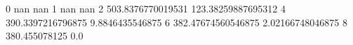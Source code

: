 0 nan nan
1 nan nan
2 503.8376770019531 123.38259887695312
4 390.3397216796875 9.8846435546875
6 382.47674560546875 2.02166748046875
8 380.455078125 0.0
